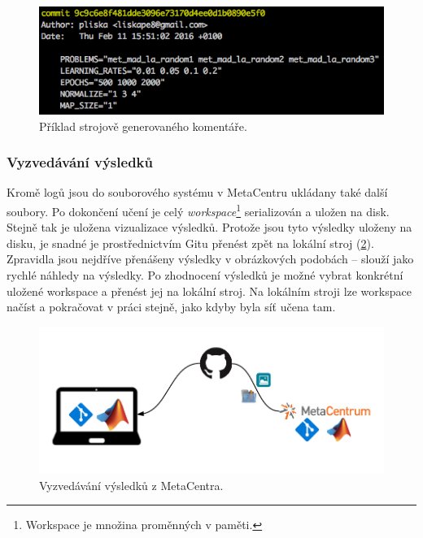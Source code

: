 \documentclass[thesis=M,czech]{FITthesis}[2012/06/26]
\begin{document}
\begin{figure}[htbp]
\begin{center}
	\includegraphics[scale=0.7]{semantic_commit}
\caption{Příklad strojově generovaného komentáře.}
\label{fig:semantic_commit}
\end{center}
\end{figure}



\subsubsection*{Vyzvedávání výsledků}
Kromě logů jsou do souborového systému v MetaCentru ukládany také další soubory. Po dokončení učení je celý \textit{workspace}\footnote{Workspace je množina proměnných v paměti.} serializován a uložen na disk. Stejně tak je uložena vizualizace výsledků. Protože jsou tyto výsledky uloženy na disku, je snadné je prostřednictvím Gitu přenést zpět na lokální stroj (\ref{fig:down}). Zpravidla jsou nejdříve přenášeny výsledky v obrázkových podobách -- slouží jako rychlé náhledy na výsledky. Po zhodnocení výsledků je možné vybrat konkrétní uložené workspace a přenést jej na lokální stroj. Na lokálním stroji lze workspace načíst a pokračovat v práci stejně, jako kdyby byla síť učena tam.

\begin{figure}[htbp]
\begin{center}
	\includegraphics[scale=0.9]{down.png}
\caption{Vyzvedávání výsledků z MetaCentra.}
\label{fig:down}
\end{center}
\end{figure}
\end{document}
